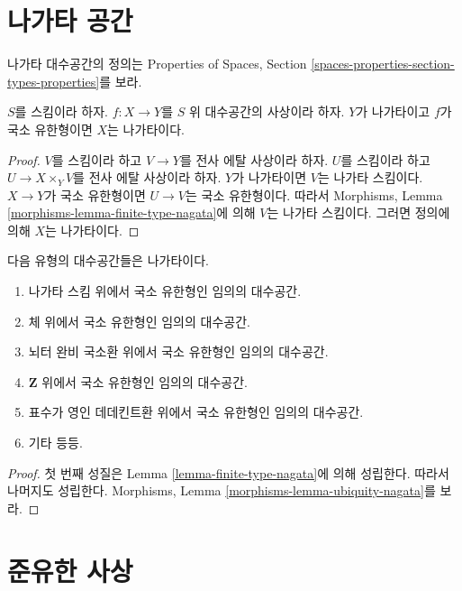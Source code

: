 \section{나가타 공간}
\label{section-nagata}

\noindent
나가타 대수공간의 정의는 Properties of Spaces, Section
\ref{spaces-properties-section-types-properties}를 보라.

\begin{lemma}
\label{lemma-finite-type-nagata}
$S$를 스킴이라 하자.
$f : X \to Y$를 $S$ 위 대수공간의 사상이라 하자.
$Y$가 나가타이고 $f$가 국소 유한형이면 $X$는 나가타이다.
\end{lemma}

\begin{proof}
$V$를 스킴이라 하고 $V \to Y$를 전사 에탈 사상이라 하자.
$U$를 스킴이라 하고 $U \to X \times_Y V$를 전사 에탈 사상이라 하자.
$Y$가 나가타이면 $V$는 나가타 스킴이다.
$X \to Y$가 국소 유한형이면 $U \to V$는 국소 유한형이다.
따라서 Morphisms, Lemma
\ref{morphisms-lemma-finite-type-nagata}에 의해 $V$는 나가타 스킴이다.
그러면 정의에 의해 $X$는 나가타이다.
\end{proof}

\begin{lemma}
\label{lemma-ubiquity-nagata}
다음 유형의 대수공간들은 나가타이다.
\begin{enumerate}
\item 나가타 스킴 위에서 국소 유한형인 임의의 대수공간.
\item 체 위에서 국소 유한형인 임의의 대수공간.
\item 뇌터 완비 국소환 위에서 국소 유한형인 임의의 대수공간.
\item $\mathbf{Z}$ 위에서 국소 유한형인 임의의 대수공간.
\item 표수가 영인 데데킨트환 위에서 국소 유한형인 임의의 대수공간.
\item 기타 등등.
\end{enumerate}
\end{lemma}

\begin{proof}
첫 번째 성질은 Lemma \ref{lemma-finite-type-nagata}에 의해 성립한다.
따라서 나머지도 성립한다. Morphisms, Lemma
\ref{morphisms-lemma-ubiquity-nagata}를 보라.
\end{proof}

\section{준유한 사상}
\label{section-quasi-finite}


